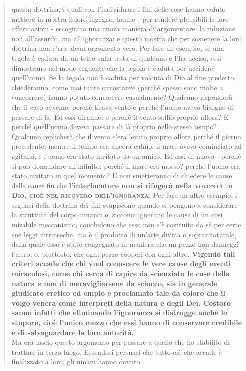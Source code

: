 \begin{quotation}
{	questa dottrina, i quali con l’individuare i fini delle cose hanno voluto mettere in mostra il
	loro ingegno, hanno - per rendere plausibili le loro affermazioni - escogitato una nuova maniera di argomentare: la riduzione non all’assurdo, ma all’ignoranza: e questo mostra
	che per sostenere la loro dottrina non c’era alcun argomento vero.} Per fare un esempio, se
	una tegola è caduta da un tetto sulla testa di qualcuno e l’ha ucciso, essi dimostrano nel
	modo seguente che la tegola è caduta per uccidere quell’uomo. Se la tegola non è caduta
	per volontà di Dio al fine predetto, chiederanno, come mai tante circostanze (perché spesso
	sono molte a concorrere) hanno potuto concorrere casualmente? Qualcuno risponderà che
	il caso avvenne perché tirava vento e perché l’uomo aveva bisogno di passare di là. Ed essi
	diranno: e perché il vento soffiò proprio allora? E perché quell’uomo doveva passare di là
	proprio nello stesso tempo? Qualcuno replicherà che il vento s’era levato proprio allora
	perché il giorno precedente, mentre il tempo era ancora calmo, il mare aveva cominciato
	ad agitarsi; e l’uomo era stato invitato da un amico. Ed essi di nuovo - perché si può domandare all’infinito: perché il mare era mosso? perché l’uomo era stato invitato in quel
	momento? E non smetteranno di chiedere le cause delle cause fin che \textbf{l’interlocutore non si
	rifugerà nella \textsc{volontà di Dio, cioè nel ricovero dell’ignoranza.}} Per fare un altro esempio, i
	seguaci della dottrina dei fini stupiscono quando si pongono a considerare la struttura del
	corpo umano: e, siccome ignorano le cause di un così mirabile meccanismo, concludono
	che esso non s’è costruito da sé per certe sue leggi intrinseche, ma è il prodotto di un’arte
	divina o soprannaturale, dalla quale esso è stato congegnato in maniera che un pezzo non
	danneggi l’altro, o, piuttosto, che ogni pezzo cooperi con ogni altro. \textbf{Vigendo tali criteri accade che chi vuol conoscere le vere cause degli eventi miracolosi, come chi cerca di capire
	da scienziato le cose della natura e non di meravigliarsene da sciocco, sia in generale giudicato eretico ed empio e proclamato tale da coloro che il volgo venera come interpreti della
	natura e degli Dei. Costoro sanno infatti che eliminando l’ignoranza si distrugge anche lo
	stupore, cioè l’unico mezzo che essi hanno di conservare credibile e di salvaguardare la loro
	autorità.} \\
	Ma ora lascio questo argomento per passare a quello che ho stabilito di trattare in
	terzo luogo.
	Essendosi persuasi che tutto ciò che accade è finalizzato a loro, gli umani hanno dovuto

\end{quotation}
